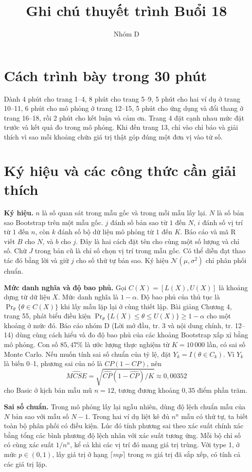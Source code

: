\documentclass[11pt,a4paper]{article}
\title{Ghi chú thuyết trình Buổi 18}
\author{Nhóm D}
\date{}
\begin{document}
\maketitle

\section{Cách trình bày trong 30 phút}
Dành 4 phút cho trang 1--4, 8 phút cho trang 5--9, 5 phút cho hai ví dụ
ở trang 10--11, 6 phút cho mô phỏng ở trang 12--15, 5 phút cho ứng dụng
và đổi thang ở trang 16--18, rồi 2 phút cho kết luận và cảm ơn.
Trang 4 đặt cạnh nhau mức đặt trước và kết quả đo trong mô phỏng.
Khi đến trang 13, chỉ vào chỉ báo và giải thích vì sao mỗi khoảng
chứa giá trị thật góp đúng một đơn vị vào tử số.

\section{Ký hiệu và các công thức cần giải thích}
\textbf{Ký hiệu.}
$n$ là số quan sát trong mẫu gốc và trong mỗi mẫu lấy lại.
$N$ là số bản sao Bootstrap trên một mẫu gốc. $j$ đánh số bản sao từ $1$ đến $N$,
$i$ đánh số vị trí từ $1$ đến $n$, còn $k$ đánh số bộ dữ liệu mô phỏng từ $1$ đến $K$.
Báo cáo và mã R viết $B$ cho $N$, và $b$ cho $j$. Đây là hai cách đặt tên cho
cùng một số lượng và chỉ số. Chữ $J$ trong bản cũ là chỉ số chọn vị trí
trong mẫu gốc. Có thể diễn đạt thao tác đó bằng lời và giữ $j$ cho số thứ tự bản sao.
Ký hiệu $\mathcal N(\mu,\sigma^2)$ chỉ phân phối chuẩn.

\textbf{Mức danh nghĩa và độ bao phủ.}
Gọi $C(X)=[L(X),U(X)]$ là khoảng dựng từ dữ liệu $X$.
Mức danh nghĩa là $1-\alpha$. Độ bao phủ của thủ tục là
$\Pr_\theta\{\theta\in C(X)\}$ khi lấy mẫu lặp lại ở cùng thiết lập.
Bài giảng Chương 4, trang 55, phát biểu điều kiện
$\Pr_\theta\{L(X)\le\theta\le U(X)\}\ge1-\alpha$ cho một khoảng ở mức đó.
Báo cáo nhóm D (Lời mở đầu, tr. 3 và nội dung chính, tr. 12--14) dùng cùng cách hiểu và đo độ bao phủ
của các khoảng Bootstrap xấp xỉ bằng mô phỏng. Con số $85{,}47\%$
là ước lượng thực nghiệm từ $K=10\,000$ lần, có sai số Monte Carlo.
Nếu muốn tính sai số chuẩn của tỷ lệ, đặt $Y_k=I(\theta\in C_k)$.
Vì $Y_k$ là biến 0--1, phương sai của nó là $CP(1-CP)$, nên
\[
    \widehat{MCSE}=\sqrt{\widehat{CP}(1-\widehat{CP})/K}
        \approx 0{,}00352
\]
cho Basic ở kịch bản mẫu mũ $n=12$, tương đương khoảng $0{,}35$ điểm phần trăm.

\textbf{Sai số chuẩn.}
Trong mô phỏng lấy lại ngẫu nhiên, dùng độ lệch chuẩn mẫu của $N$ bản sao
với mẫu số $N-1$. Trong hai ví dụ liệt kê đủ $n^n$ mẫu có thứ tự, ta biết
toàn bộ phân phối có điều kiện. Lúc đó tính phương sai theo xác suất chính
xác bằng tổng các bình phương độ lệch nhân với xác suất tương ứng.
Mỗi bộ chỉ số có cùng xác suất $1/n^n$, kể cả khi các vị trí đó mang giá trị trùng.
Với type 1, ở mức $p\in(0,1)$, lấy giá trị ở hạng $\lceil mp\rceil$
trong $m$ giá trị đã sắp xếp, có tính cả các giá trị lặp.
\end{document}
